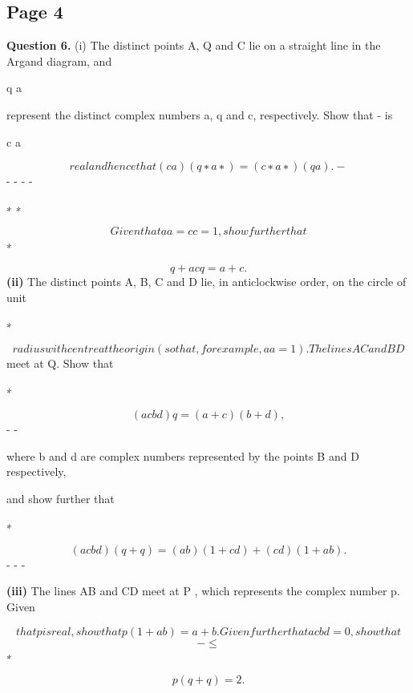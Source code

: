 \documentclass[12pt]{article}
\begin{document}
\subsection*{Page 4}
\begin{flushleft}
\bigskip\textbf{Question 6.} (i) The distinct points A, Q and C lie on a straight line in the Argand diagram, and\par
q a\par
represent the distinct complex numbers a, q and c, respectively. Show that - is\par
c a\par
\[real and hence that (c a)(q ∗ a ∗ ) = (c ∗ a ∗ )(q a) . -\]
- - - -\par
∗ ∗\par
\[Given that aa = cc = 1, show further that\]
∗\par
\[q + acq = a + c .\]
\textbf{(ii)} The distinct points A, B, C and D lie, in anticlockwise order, on the circle of unit\par
∗\par
\[radius with centre at the origin (so that, for example, aa = 1). The lines AC and BD\]
meet at Q. Show that\par
∗\par
\[(ac bd)q = (a + c) (b + d) ,\]
- -\par
where b and d are complex numbers represented by the points B and D respectively,\par
and show further that\par
∗\par
\[(ac bd)(q + q ) = (a b)(1 + cd) + (c d)(1 + ab) .\]
- - -\par
\textbf{(iii)} The lines AB and CD meet at P , which represents the complex number p. Given\par
\[that p is real, show that p(1 + ab) = a + b . Given further that ac bd = 0 , show that\]
\[- \leq\]
∗\par
\[p(q + q ) = 2 .\]
\end{flushleft}
\end{document}
